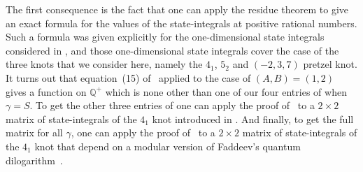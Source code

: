 \documentclass[pdftex]{sigma}
\numberwithin{equation}{section}
\def\BQ{\mathbb Q}
\def\g{\gamma}
\begin{document}
The first consequence is the fact that one can apply the
residue theorem to give an exact formula for the values of the state-integrals at
positive rational numbers. Such a formula was given explicitly for the one-dimensional
state integrals considered in \cite[equation~(1), Theorem~1.1]{GK:evaluation}, and
those one-dimensional state integrals cover the case of the three knots that we consider
here, namely the $4_1$, $5_2$ and $(-2,3,7)$ pretzel knot. It turns out that
equation~(15) of~\cite{GK:evaluation} applied to the case of $(A,B)=(1,2)$ gives a
function on $\BQ^+$ which is none other than one of our four entries of \smash{$W^{(4_1)}_\g$}
when $\g=S$. To get the other three entries of  one can apply the proof
of~\cite{GK:evaluation} to a $2 \times 2$ matrix of state-integrals of the $4_1$ knot
introduced in \cite[Theorem~3]{GGM}. And finally, to get the full matrix \smash{$W^{(4_1)}_\g$}
for all $\g$, one can apply the proof of~\cite{GK:evaluation} to a $2 \times 2$ matrix
of state-integrals of the $4_1$ knot that depend on a modular version of Faddeev's
quantum dilogarithm~\cite{GKZ:cocycle}.
\end{document}
